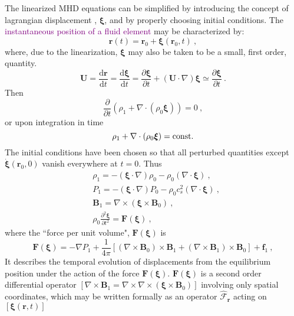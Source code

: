 \documentclass[12pt,a4paper]{article}
\renewcommand{\vec}[1]{\boldsymbol{#1}}
\newcommand{\dif}{\mathrm{d}}
\begin{document}
The linearized MHD equations can be simplified by introducing the concept of lagrangian displacement , $\vec{\xi}$, and by properly choosing initial conditions. The \textcolor{purple}{instantaneous position of a fluid element} may be characterized by:
\begin{equation*}
\vec{r}(t) = \vec{r}_0 +\vec{\xi}(\vec{r}_0, t) ~,
\end{equation*}
where, due to the linearization, $\vec{\xi}$ may also be taken to be a small, first order, quantity. 
\begin{equation*}
\vec{U} = \frac{\dif \vec{r}}{\dif t} = \frac{\dif \vec{\xi}}{\dif t} = \frac{\partial \vec{\xi}}{\partial t} +(\vec{U}\cdot \nabla) \vec{\xi} \simeq \frac{\partial \vec{\xi}}{\partial t} ~.
\end{equation*}
Then 
\begin{equation*}
\frac{\partial }{\partial t} (\rho_1 +\nabla \cdot(\rho_0 \vec{\xi} )) = 0 ~,
\end{equation*}
or upon integration in time
\begin{equation*}
\rho_1 +\nabla \cdot(\rho_0 \vec{\xi} ) = {\rm const.}
\end{equation*}
The initial conditions have been chosen so that all perturbed quantities except $\dot{\vec{\xi}}(\vec{r}_0, 0)$ vanish everywhere at $t = 0$. Thus
\begin{align}
& \rho_1 = -(\vec{\xi}\cdot \nabla)\rho_0 -\rho_0(\nabla \cdot \vec{\xi}) ~, \\
& P_1 = -(\vec{\xi}\cdot \nabla)P_0 -\rho_0c_s^2(\nabla \cdot \vec{\xi}) ~, \\
& \vec{B}_1 = \nabla \times (\vec{\xi} \times \vec{B}_0) ~, \\
& \rho_0  \frac{\partial^2 \vec{\xi}}{\partial t^2} = \vec{F}(\vec{\xi}) ~,
\end{align}
where the ``force per unit volume", $\vec{F}(\vec{\xi})$ is
\begin{equation}
\vec{F}(\vec{\xi}) = -\nabla P_1 +\frac{1}{4\pi}\left[(\nabla \times \vec{B}_0) \times \vec{B}_1 +(\nabla \times \vec{B}_1) \times \vec{B}_0 \right] +\vec{f}_1 ~,
\end{equation}
It describes the temporal evolution of displacements from the equilibrium position under the action of the force $\vec{F}(\vec{\xi})$. $\vec{F}(\vec{\xi})$ is a second order differential operator $[\nabla \times \vec{B}_1 = \nabla \times  \nabla \times (\vec{\xi} \times \vec{B}_0)]$ involving only spatial coordinates, which may be written formally as an operator $\hat{\mathcal F}_{\vec{r}}$ acting on $[\vec{\xi}(\vec{r}, t)]$
\end{document}
